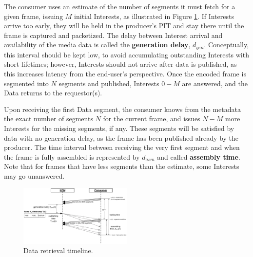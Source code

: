 \documentclass{icn/sig-alternate-2013} %
\begin{document}
The consumer uses an estimate of the number of segments it must fetch for a given frame, issuing $M$ initial Interests, as illustrated in Figure \ref{fig:pull}. If Interests arrive too early, they will be held in the producer's PIT and stay there until the frame is captured and packetized. The delay between Interest arrival and availability of the media data is called the \textbf{generation delay}, $d_{gen}$. Conceptually, this interval should be kept low, to avoid accumulating outstanding Interests with short lifetimes; however,  Interests should not arrive after data is published, as this increases latency from the end-user's perspective.  Once the encoded frame is segmented into $N$ segments and published, Interests $0 - M$ are answered, and the Data returns to the requestor(s). 

Upon receiving the first Data segment, the consumer knows from the metadata the exact number of segments $N$ for the current frame, and issues $N - M$ more Interests for the missing segments, if any. These segments will be satisfied by data with no generation delay, as the frame has been published already by the producer. The time interval between receiving the very first segment and when the frame is fully assembled is represented by $d_{asm}$ and called \textbf{assembly time}. Note that for frames that have less segments than the estimate, some Interests may go unanswered.%
 

\begin{figure}[t!]
\centering
\includegraphics[width=0.5\textwidth]{frame-fetch}
\vspace{-18pt}
\caption{Data retrieval timeline.}
\label{fig:pull}
\end{figure}
\end{document}
